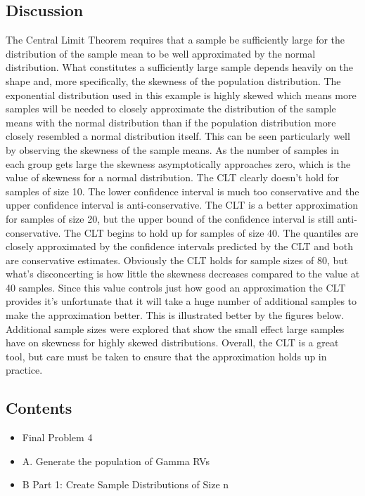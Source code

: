 \documentclass[12pt]{article}
\begin{document}
\subsection{Discussion}
The Central Limit Theorem requires that a sample be sufficiently large for the distribution of the sample mean to be well approximated 
by the normal distribution. What constitutes a sufficiently large sample depends heavily on the shape and, more specifically,
the skewness of the population distribution. The exponential distribution used in this example is highly skewed which
means more samples will be needed to closely approximate the distribution of the sample means with the normal distribution than if the
population distribution more closely resembled a normal distribution itself. This can be seen particularly well by observing the skewness
of the sample means. As the number of samples in each group gets large the skewness asymptotically approaches zero, which is the value of
skewness for a normal distribution. The CLT clearly doesn't hold for samples of size 10. The lower confidence interval is much too
conservative and the upper confidence interval is anti-conservative. The CLT is a better approximation for samples of size 20, but the
upper bound of the confidence interval is still anti-conservative. The CLT begins to hold up for samples of size 40. The quantiles are
closely approximated by the confidence intervals predicted by the CLT and both are conservative estimates. Obviously the CLT holds for
sample sizes of 80, but what's disconcerting is how little the skewness decreases compared to the value at 40 samples. Since this 
value controls just how good an approximation the CLT provides it's unfortunate that it will take a huge number of additional 
samples to make the approximation better. This is illustrated better by the figures below. Additional sample sizes were explored 
that show the small effect large samples have on skewness for highly skewed distributions. Overall, the CLT is a great tool, but 
care must be taken to ensure that the approximation holds up in practice.
\subsection*{Contents}

\begin{itemize}
\setlength{\itemsep}{-1ex}
   \item Final Problem 4
   \item A. Generate the population of Gamma RVs
   \item B Part 1: Create Sample Distributions of Size n
\end{itemize}
\end{document}
